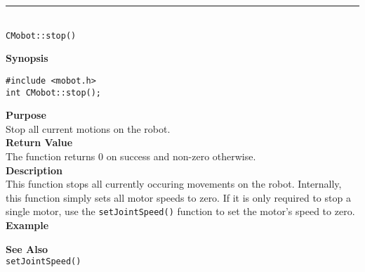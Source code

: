 \noindent
\vspace{5pt}
\rule{4.5in}{0.015in}\\
\noindent
{\LARGE \texttt{CMobot::stop()}}\\
{}

\noindent
{\bf Synopsis}\\
\begin{verbatim}
#include <mobot.h>
int CMobot::stop();
\end{verbatim}

\noindent
{\bf Purpose}\\
Stop all current motions on the robot.\\

\noindent
{\bf Return Value}\\
The function returns 0 on success and non-zero otherwise.\\

\noindent
{\bf Description}\\
This function stops all currently occuring movements on the robot. Internally, this function simply sets all motor speeds to zero. If it is only required to stop a single motor, use the 
\texttt{setJointSpeed()} function to set the motor's speed to zero. \\

\noindent
{\bf Example}\\
\noindent

\noindent
{\bf See Also}\\
\texttt{setJointSpeed()}


